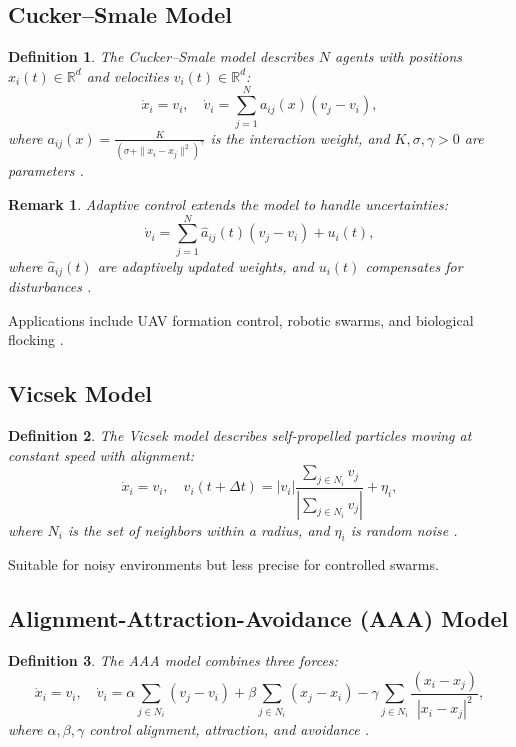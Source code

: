\documentclass{article}
\theoremstyle{plain}
\newtheorem{definition}{Definition}[section]
\newtheorem{remark}{Remark}[section]
\begin{document}
\subsection{Cucker--Smale Model}
\begin{definition}
The \emph{Cucker--Smale model} describes \(N\) agents with positions \(x_i(t) \in \mathbb{R}^d\) and velocities \(v_i(t) \in \mathbb{R}^d\):
\[
\dot{x}_i = v_i, \quad \dot{v}_i = \sum_{j=1}^N a_{ij}(x) (v_j - v_i),
\]
where \(a_{ij}(x) = \frac{K}{(\sigma + \|x_i - x_j\|^2)^\gamma}\) is the
interaction weight, and \(K, \sigma, \gamma > 0\) are parameters \cite{cucker_smale}.
\end{definition}

\begin{remark}
Adaptive control extends the model to handle uncertainties:
\[
\dot{v}_i = \sum_{j=1}^N \hat{a}_{ij}(t) (v_j - v_i) + u_i(t),
\]
where \(\hat{a}_{ij}(t)\) are adaptively updated weights, and \(u_i(t)\) compensates for disturbances \cite{adaptive_swarm}.
\end{remark}

Applications include UAV formation control, robotic swarms, and biological flocking \cite{uav_swarm}.

\subsection{Vicsek Model}
\begin{definition}
The \emph{Vicsek model} describes self-propelled particles moving at constant speed with alignment:
\[
\dot{x}_i = v_i, \quad v_i(t + \Delta t) = |v_i| \frac{\sum_{j \in N_i} v_j}{|\sum_{j \in N_i} v_j|} + \eta_i,
\]
where \(N_i\) is the set of neighbors within a radius, and \(\eta_i\) is random noise \cite{vicsek_model}.
\end{definition}

Suitable for noisy environments but less precise for controlled swarms.

\subsection{Alignment-Attraction-Avoidance (AAA) Model}
\begin{definition}
The \emph{AAA model} combines three forces:
\[
\dot{x}_i = v_i, \quad \dot{v}_i = \alpha \sum_{j \in N_i} (v_j - v_i) + \beta \sum_{j \in N_i} (x_j - x_i) - \gamma \sum_{j \in N_i} \frac{(x_i - x_j)}{|x_i - x_j|^2},
\]
where \(\alpha, \beta, \gamma\) control alignment, attraction, and avoidance \cite{aaa_model}.
\end{definition}
\end{document}
